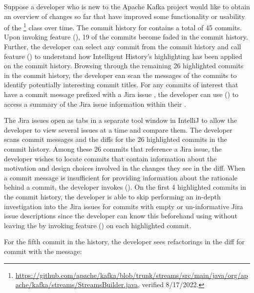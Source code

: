Suppose a developer who is new to the Apache Kafka project would like to obtain an 
overview of changes so far that have improved some functionality or usability of 
the \footnote{\url{https://github.com/apache/kafka/blob/trunk/streams/src/main/java/org/apache/kafka/streams/StreamsBuilder.java}, verified 8/17/2022.} class over time.
The commit history for  contains a total of 45 commits.
Upon invoking feature (), 19 of the commits become faded in the commit history.
Further, the developer can select any commit from the commit history and call feature () to understand how Intelligent History's highlighting has been applied on the  commit history.
Browsing through the remaining 26 highlighted commits in the  commit history, the developer can scan the messages of the commits to identify potentially interesting commit titles.
For any commits of interest that have a commit message prefixed with a Jira issue , the developer can use () to access a summary of the Jira issue information within their .

The Jira issues open as tabs in a separate tool window in IntelliJ to allow the developer to view several issues at a time and compare them.
The developer scans commit messages and the diffs for the 26 highlighted commits in the  commit history.
Among these 26 commits that reference a Jira issue, the developer wishes to locate commits that contain information about the motivation and design choices involved in the changes they see in the diff.
When a commit message is insufficient for providing information about the rationale behind a commit, the developer invokes ().
On the first 4 highlighted commits in the commit history, the developer is able to skip performing an in-depth investigation into the Jira issues for commits with empty or un-informative Jira issue descriptions since the developer can know this beforehand using without leaving the  by invoking feature () on each highlighted commit.

For the fifth commit in the history, the developer sees refactorings in the diff for commit  with the message:

\begin{center}
\end{center}

